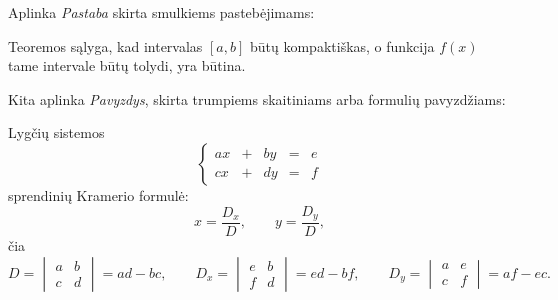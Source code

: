 \documentclass[]{VUMIFTemplateClass}
\begin{document}
\noindent Aplinka \emph{Pastaba} skirta smulkiems pastebėjimams:

\begin{remark}
Teoremos sąlyga, kad intervalas $[a, b]$ būtų kompaktiškas, o funkcija $f(x)$ tame intervale būtų tolydi, yra būtina.
\end{remark}

\noindent Kita aplinka \emph{Pavyzdys}, skirta trumpiems skaitiniams arba formulių pavyzdžiams:

\begin{example}
Lygčių sistemos
\[
\left\{
\begin{array}{rclcl}
    ax & + & by & = & e\\
    cx & + & dy & = & f
\end{array}
\right.
\]
sprendinių Kramerio formulė:
\[
x = \frac{D_{x}}{D}, \qquad y = \frac{D_{y}}{D},\]
čia
\[
D=
\begin{vmatrix}
a & b\\
c & d    
\end{vmatrix}=ad-bc, \qquad
D_x=
\begin{vmatrix}
e & b\\
f & d    
\end{vmatrix}=ed-bf, \qquad
D_y=
\begin{vmatrix}
a & e\\
c & f    
\end{vmatrix}=af-ec.
\]
\end{example}
\end{document}
